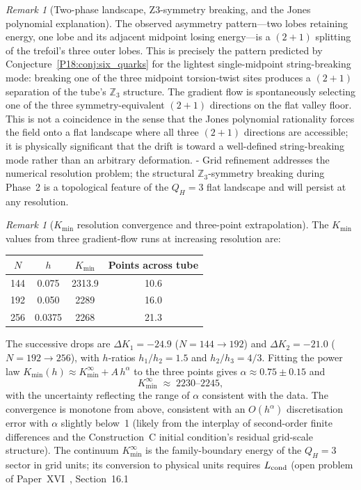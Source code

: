 \documentclass[11pt,a4paper]{article}
\theoremstyle{definition}\newtheorem{definition}[theorem]{Definition}
\theoremstyle{remark}
\newtheorem{remark}[theorem]{Remark}
\newcommand{\QH}{Q_H}
\begin{document}
\begin{remark}[Two-phase landscape, Z3-symmetry breaking, and the Jones
  polynomial explanation]
The observed asymmetry pattern---two lobes retaining energy, one lobe and
its adjacent midpoint losing energy---is a $(2{+}1)$ splitting of the
trefoil's three outer lobes.  This is precisely the pattern predicted by
Conjecture~\ref{P18:conj:six_quarks} for the lightest single-midpoint
string-breaking mode: breaking one of the three midpoint torsion-twist sites
produces a $(2{+}1)$ separation of the tube's $\mathbb{Z}_3$ structure.  The
gradient flow is spontaneously selecting one of the three symmetry-equivalent
$(2{+}1)$ directions on the flat valley floor.  This is not a coincidence in
the sense that the Jones polynomial rationality forces the field onto a
flat landscape where all three $(2{+}1)$ directions are accessible; it is
physically significant that the drift is toward a well-defined string-breaking
mode rather than an arbitrary deformation.
-
Grid refinement addresses the numerical resolution problem; the structural
$\mathbb{Z}_3$-symmetry breaking during Phase~2 is a topological feature of
the $\QH=3$ flat landscape and will persist at any resolution.
\end{remark}

\begin{remark}[$K_{\min}$ resolution convergence and three-point extrapolation]
\label{P18:rem:kmin_extrapolation}
The $K_{\min}$ values from three gradient-flow runs at increasing resolution
are:
\begin{center}
\begin{tabular}{cccc}
\toprule
$N$ & $h$ & $K_{\min}$ & Points across tube \\
\midrule
144 & 0.075 & 2313.9 & 10.6 \\
192 & 0.050 & 2289\phantom{.0} & 16.0 \\
256 & 0.0375 & 2268\phantom{.0} & 21.3 \\
\bottomrule
\end{tabular}
\end{center}
The successive drops are $\Delta K_1=-24.9$ ($N=144\to192$) and
$\Delta K_2=-21.0$ ($N=192\to256$), with $h$-ratios $h_1/h_2=1.5$ and
$h_2/h_3=4/3$.  Fitting the power law
$K_{\min}(h)\approx K_{\min}^\infty+A\,h^\alpha$ to the three points
gives $\alpha\approx0.75\pm0.15$ and
\begin{equation}
  K_{\min}^\infty \;\approx\; 2230\text{--}2245,
  \label{P18:eq:kmin_extrap}
\end{equation}
with the uncertainty reflecting the range of $\alpha$ consistent with the
data.  The convergence is monotone from above, consistent with an
$O(h^\alpha)$ discretisation error with $\alpha$ slightly below~1 (likely
from the interplay of second-order finite differences and the
Construction~C initial condition's residual grid-scale structure).
The continuum $K_{\min}^\infty$ is the family-boundary energy of the
$\QH=3$ sector in grid units; its conversion to physical units requires
$L_{\rm cond}$ (open problem of Paper~XVI~\cite{Paper16},
Section~16.1 %
\end{remark}
\end{document}
